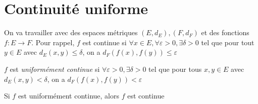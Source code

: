 \section{Continuité uniforme}
On va travailler avec des espaces métriques $(E,d_E), (F,d_F)$ et des fonctions $f : E\to F$. Pour rappel, $f$ est continue si $\forall x\in E,\forall \varepsilon>0,\exists \delta > 0$ tel que pour tout $y\in E$ avec $d_E(x,y)\le \delta$, on a $d_F(f(x),f(y))\le \varepsilon$
\begin{definition}
    $f$ est \emph{uniformément continue} si $\forall \varepsilon>0, \exists\delta>0$ tel que pour tous $x,y\in E$ avec $d_E(x,y)< \delta$, on a $d_F(f(x),f(y))<\varepsilon$
\end{definition}
\begin{remarque}
    Si $f$ est uniformément continue, alors $f$ est continue
\end{remarque}
